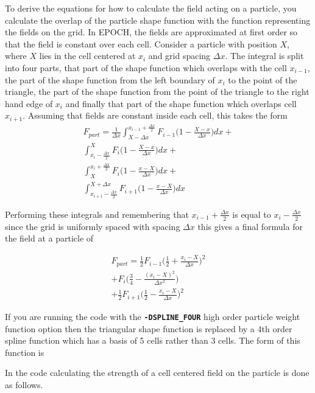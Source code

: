 \documentclass[12pt,a4paper]{article}
\newcommand{\inlinecode}[1]{{\color{warwickred} \bf\texttt{#1}}}
\begin{document}
To derive the equations for how to calculate the field acting on a particle,
you calculate the overlap of the particle shape function with the function
representing the fields on the grid. In EPOCH, the fields are approximated at
first order so that the field is constant over each cell. Consider a particle
with position $X$, where $X$ lies in the cell centered at $x_i$ and grid
spacing $\Delta x$. The integral is split into four parts, that part of the
shape function which overlaps with the cell $x_{i-1}$, the part of the shape
function from the left boundary of $x_i$ to the point of the triangle, the part
of the shape function from the point of the triangle to the right hand edge of
$x_i$ and finally that part of the shape function which overlaps cell
$x_{i+1}$. Assuming that fields are constant inside each cell, this takes the
form
\begin{eqnarray*}
  F_{part} = \frac{1}{\Delta x} \int^{x_{i-1}+\frac{\Delta x}{2}}_{X-\Delta x} F_{i-1} \bigl( 1-\frac{X-x}{\Delta x} \bigr) dx + \\ \int^{X}_{x_i-\frac{\Delta x}{2}} F_i \bigl( 1-\frac{X-x}{\Delta x} \bigr) dx + \\ \int^{x_i+\frac{\Delta x}{2}}_{X} F_i \bigl(  1-\frac{x-X}{\Delta x}\bigr) dx + \\ \int^{X+\Delta x}_{x_{i+1} - \frac{\Delta x}{2}} F_{i+1} \bigl( 1-\frac{x-X}{\Delta x}\bigr) dx
\end{eqnarray*}

Performing these integrals and remembering that $x_{i-1}+\frac{\Delta x}{2}$ is
equal to $x_i-\frac{\Delta x}{2}$ since the grid is uniformly spaced with
spacing $\Delta x$ this gives a final formula for the field at a particle of

\begin{eqnarray*}
  F_{part} = \frac{1}{2} F_{i-1} \bigl( \frac{1}{2} + \frac{x_i-X}{\Delta x} \bigr)^2 \\
  + F_i \bigl( \frac{3}{4} - \frac{(x_i-X)^2}{\Delta x^2} \bigr)\\
  +\frac{1}{2} F_{i+1} \bigl( \frac{1}{2} - \frac{x_i-X}{\Delta x} \bigr)^2
\end{eqnarray*}

If you are running the code with the \inlinecode{-DSPLINE\_FOUR} high order
particle weight function option then the triangular shape function is replaced
by a 4th order spline function which has a basis of 5 cells rather than 3
cells. The form of this function is

In the code calculating the strength of a cell centered field on the particle
is done as follows.
\end{document}
